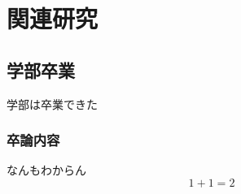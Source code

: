 ﻿\chapter{関連研究}
\thispagestyle{fancy} %

\section{学部卒業}
学部は卒業できた
\subsection{卒論内容}
なんもわからん
\begin{equation}
1+1=2
\end{equation}